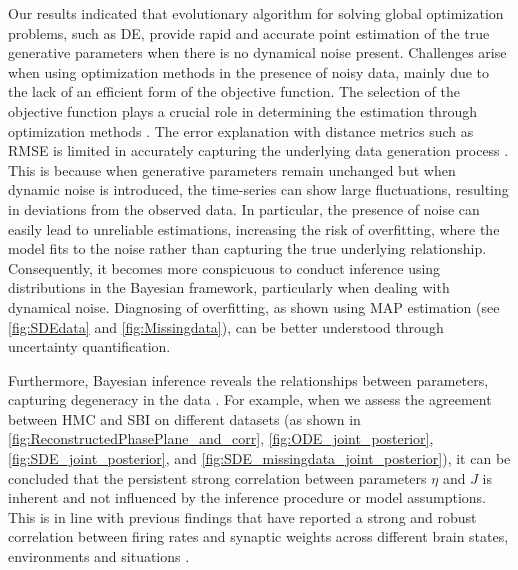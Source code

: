 \documentclass[preprint,11pt,authoryear]{elsarticle}
\begin{document}
Our results indicated that evolutionary algorithm for solving global optimization problems, such as DE, provide rapid and accurate point estimation of the true generative parameters when there is no dynamical noise present.
Challenges arise when using optimization methods in the presence of noisy data, mainly due to the lack of an efficient form of the objective function. The selection of the objective function plays a crucial role in determining the estimation through optimization methods \citep{Svensson2012, Hashemi2018}. The error explanation with distance metrics such as RMSE is limited in accurately capturing the underlying data generation process \citep{Baldy2023}. This is because when generative parameters remain unchanged but when dynamic noise is introduced, the time-series can show large fluctuations, resulting in deviations from the observed data. In particular, the presence of noise can easily lead to unreliable estimations, increasing the risk of overfitting, where the model fits to the noise rather than capturing the true underlying relationship. Consequently, it becomes more conspicuous to conduct inference using distributions in the Bayesian framework, particularly when dealing with dynamical noise.  Diagnosing of overfitting, as shown using MAP estimation (see \autoref{fig:SDEdata} and \autoref{fig:Missingdata}), can be better understood through uncertainty quantification. 


Furthermore, Bayesian inference reveals the relationships between parameters, capturing degeneracy in the data \citep{Edelman2001, Hashemi2023}. For example, when we assess the agreement between HMC and SBI on different datasets (as shown in \autoref{fig:ReconstructedPhasePlane_and_corr}, \autoref{fig:ODE_joint_posterior}, \autoref{fig:SDE_joint_posterior}, and \autoref{fig:SDE_missingdata_joint_posterior}), it can be concluded that the persistent strong correlation between parameters $\eta$ and $J$ is inherent and not influenced by the inference procedure or model assumptions. This is in line with previous findings that have reported a strong and robust correlation between firing rates and synaptic weights across different brain states, environments and situations \citep{Buzsaki2014}. 
\end{document}
